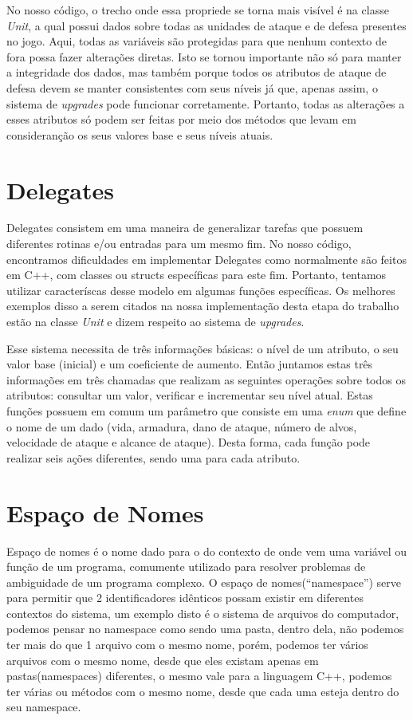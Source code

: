\documentclass[rel_mlp]{iiufrgs}
\begin{document}
 	No nosso código, o trecho onde essa propriede se torna mais visível é na classe \textit{Unit}, a qual possui dados sobre todas as unidades de ataque e de defesa presentes no jogo. Aqui, todas as variáveis são protegidas para que nenhum contexto de fora possa fazer alterações diretas. Isto se tornou importante não só para manter a integridade dos dados, mas também porque todos os atributos de ataque de defesa devem se manter consistentes com seus níveis já que, apenas assim, o sistema de \textit{upgrades} pode funcionar corretamente. Portanto, todas as alterações a esses atributos só podem ser feitas por meio dos métodos que levam em consideranção os seus valores base e seus níveis atuais.


 \section{Delegates}

 	Delegates consistem em uma maneira de generalizar tarefas que possuem diferentes rotinas e/ou entradas para um mesmo fim. No nosso código, encontramos dificuldades em implementar Delegates como normalmente são feitos em C++, com classes ou structs específicas para este fim. Portanto, tentamos utilizar caracteríscas desse modelo em algumas funções específicas. Os melhores exemplos disso a serem citados na nossa implementação desta etapa do trabalho estão na classe \textit{Unit} e dizem respeito ao sistema de \textit{upgrades}.

 	Esse sistema necessita de três informações básicas: o nível de um atributo, o seu valor base (inicial) e um coeficiente de aumento. Então juntamos estas três informações em três chamadas que realizam as seguintes operações sobre todos os atributos: consultar um valor, verificar e incrementar seu nível atual. Estas funções possuem em comum um parâmetro que consiste em uma \textit{enum} que define o nome de um dado (vida, armadura, dano de ataque, número de alvos, velocidade de ataque e alcance de ataque). Desta forma, cada função pode realizar seis ações diferentes, sendo uma para cada atributo.

    \section{Espaço de Nomes}
   Espaço de nomes é o nome dado para o do contexto de onde vem uma variável ou função de um programa, comumente utilizado para resolver problemas de ambiguidade de um programa complexo. O espaço de nomes(“namespace”) serve para permitir que 2 identificadores idênticos possam existir em diferentes contextos do sistema, um exemplo disto é o sistema de arquivos do computador, podemos pensar no namespace como sendo uma pasta, dentro dela, não podemos ter mais do que 1 arquivo com o mesmo nome, porém, podemos ter vários arquivos com o mesmo nome, desde que eles existam apenas em pastas(namespaces) diferentes, o mesmo vale para a linguagem C++, podemos ter várias ou métodos com o mesmo nome, desde que cada uma esteja dentro do seu namespace.
\end{document}
